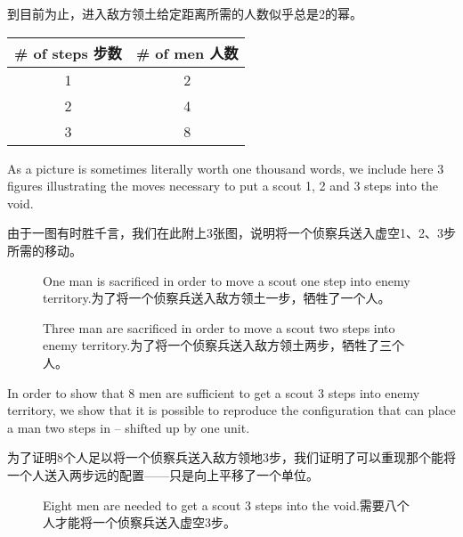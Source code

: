 到目前为止，进入敌方领土给定距离所需的人数似乎总是2的幂。

\begin{center}
\begin{tabular}{c|c}
\# of steps 步数 & \# of men 人数 \\ \hline
1 & 2 \\
2 & 4 \\
3 & 8 \\
\end{tabular}
\end{center}  

As a picture is sometimes literally worth one thousand words, we
include here 3 figures illustrating the moves necessary to put 
a scout 1, 2 and 3 steps into the void.

由于一图有时胜千言，我们在此附上3张图，说明将一个侦察兵送入虚空1、2、3步所需的移动。

\begin{figure}[!hbtp] 
\begin{center}

\end{center}
\caption[Moving one step into the void is trivial.迈入虚空一步是微不足道的。]{One man is sacrificed in 
order to move a scout one step into enemy territory.为了将一个侦察兵送入敌方领土一步，牺牲了一个人。}
\label{fig:one_step}
\end{figure}

\begin{figure}[!hbtp] 
\begin{center}

\end{center}
\caption[Moving two steps into the void is more difficult.迈入虚空两步更加困难。]{Three man are sacrificed in 
order to move a scout two steps into enemy territory.为了将一个侦察兵送入敌方领土两步，牺牲了三个人。}
\label{fig:two_steps}
\end{figure}

In order to show that 8 men are sufficient to get a scout 3 steps into
enemy territory, we show that it is possible to reproduce the configuration
that can place a man two steps in -- shifted up by one unit.

为了证明8个人足以将一个侦察兵送入敌方领地3步，我们证明了可以重现那个能将一个人送入两步远的配置——只是向上平移了一个单位。

\begin{figure}[!hbtp] 
\hspace{-.2in}
\caption[Moving three steps into the void takes 8 men.迈入虚空三步需要8个人。]{Eight men are needed to
get a scout 3 steps into the void.需要八个人才能将一个侦察兵送入虚空3步。}
\label{fig:three_steps}
\end{figure}

